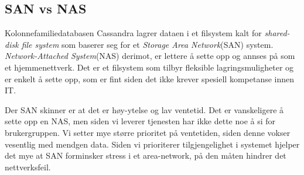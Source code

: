 \subsection{SAN vs NAS}
Kolonnefamiliedatabasen Cassandra lagrer dataen i et filsystem kalt for \textit{shared-disk file system} som baserer seg for et \textit{Storage Area Network}(SAN) system. \textit{Network-Attached System}(NAS) derimot, er lettere å sette opp og annses på som et hjemmenettverk. Det er et filsystem som tilbyr fleksible lagringsmuligheter og er enkelt å sette opp, som er fint siden det ikke krever spesiell kompetanse innen IT.

Der SAN skinner er at det er høy-ytelse og lav ventetid. Det er vanskeligere å sette opp en NAS, men siden vi leverer tjenesten har ikke dette noe å si for brukergruppen. Vi setter mye større prioritet på ventetiden, siden denne vokser vesentlig med mendgen data. Siden vi prioriterer tilgjengelighet i systemet hjelper det mye at SAN forminsker stress i et area-network, på den måten hindrer det nettverksfeil. 